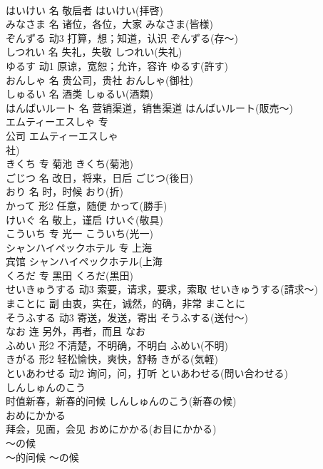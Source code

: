 \documentclass[8pt]{extreport}
\begin{document}
\begin{CJK}{UTF8}{min}
\\	はいけい	名	敬启者	はいけい(拝啓)	
\\	みなさま	名	诸位，各位，大家	みなさま(皆様)	
\\	ぞんずる	动3	打算，想；知道，认识	ぞんずる(存～)	
\\	しつれい	名	失礼，失敬	しつれい(失礼)	
\\	ゆるす	动1	原谅，宽恕；允许，容许	ゆるす(許す)	
\\	おんしゃ	名	贵公司，贵社	おんしゃ(御社)	
\\	しゅるい	名	酒类	しゅるい(酒類)	
\\	はんばいルート	名	营销渠道，销售渠道	はんばいルート(販売～)	
\\	エムティーエスしゃ	专	
\\	公司	エムティーエスしゃ
\\	社)	
\\	きくち	专	菊池	きくち(菊池)	
\\	ごじつ	名	改日，将来，日后	ごじつ(後日)	
\\	おり	名	时，时候	おり(折)	
\\	かって	形2	任意，随便	かって(勝手)	
\\	けいぐ	名	敬上，谨启	けいぐ(敬具)	
\\	こういち	专	光一	こういち(光一)	
\\	シャンハイペックホテル	专	上海
\\	宾馆	シャンハイペックホテル(上海
\\	くろだ	专	黑田	くろだ(黒田)	
\\	せいきゅうする	动3	索要，请求，要求，索取	せいきゅうする(請求～)	
\\	まことに	副	由衷，实在，诚然，的确，非常	まことに	
\\	そうふする	动3	寄送，发送，寄出	そうふする(送付～)	
\\	なお	连	另外，再者，而且	なお	
\\	ふめい	形2	不清楚，不明确，不明白	ふめい(不明)	
\\	きがる	形2	轻松愉快，爽快，舒畅	きがる(気軽)	
\\	といあわせる	动2	询问，问，打听	といあわせる(問い合わせる)	
\\	しんしゅんのこう	
\\	时值新春，新春的问候	しんしゅんのこう(新春の候)	
\\	おめにかかる	
\\	拜会，见面，会见	おめにかかる(お目にかかる)	
\\	～の候	
\\	～的问候	～の候	

\end{CJK}
\end{document}
